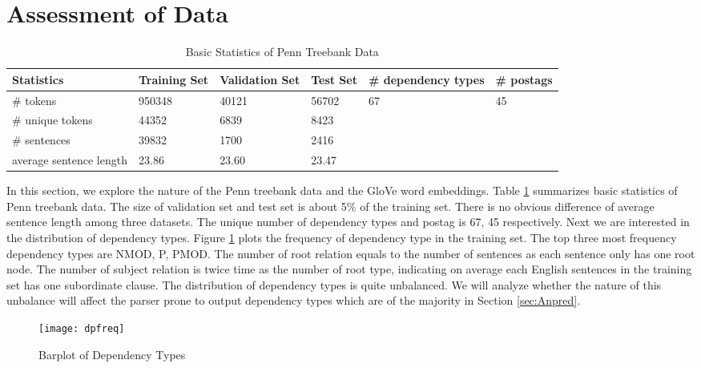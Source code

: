 \section{Assessment of Data}
\label{sec:Assessment of Data}
\begin{table}
\centering
    \begin{tabular}{@{}p{3cm} l l l |p{2.2cm} l@{}} \toprule
    Statistics&Training Set&Validation Set& Test Set&\# dependency types&\# postags\\  \midrule
    \# tokens&950348&40121&56702&67&45\\
    \# unique tokens&44352&6839&8423\\
    \# sentences&39832&1700&2416\\
    average sentence length&23.86& 23.60&23.47 \\
    \bottomrule
    \end{tabular}
\caption{Basic Statistics of Penn Treebank Data}\label{tab:bstat}
\end{table}
In this section, we explore the nature of the Penn treebank data and the GloVe word embeddings. Table \ref{tab:bstat} summarizes basic statistics of Penn treebank data. The size of validation set and test set is about 5\% of the training set. There is no obvious difference of average sentence length among three datasets. The unique number of dependency types and postag is 67, 45 respectively. Next we are interested in the distribution of dependency types. Figure \ref{fig:dpfreq} plots the frequency of dependency type in the training set. The top three most frequency dependency types are NMOD, P, PMOD. The number of root relation equals to the number of sentences as each sentence only has one root node. The number of subject relation is twice time as the number of root type, indicating on average each English sentences in the training set has one subordinate clause. The distribution of dependency types is quite unbalanced. We will analyze whether the nature of this unbalance will affect the parser prone to output dependency types which are of the majority in Section \ref{sec:Anpred}.

\begin{figure}
  \centering
    \texttt{[image: dpfreq]}
  \caption{Barplot of Dependency Types}
  \label{fig:dpfreq}
\end{figure}

